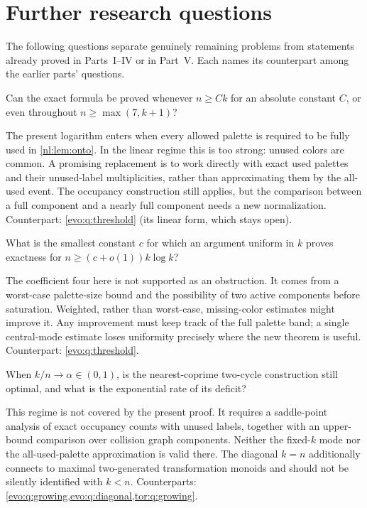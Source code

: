 \documentclass[11pt,a4paper]{article}
\numberwithin{equation}{section}
\theoremstyle{definition}
\theoremstyle{remark}
\begin{document}
\section{Further research questions}\label{nl:sec:questions}

The following questions separate genuinely remaining problems from
statements already proved in Parts~I--IV or in Part~V. Each names its
counterpart among the earlier parts' questions.

\begin{question}\label{nl:q:linear}
Can the exact formula be proved whenever $n\ge Ck$ for an absolute
constant $C$, or even throughout $n\ge\max(7,k+1)$?
\end{question}
The present logarithm enters when every allowed palette is required to be
fully used in \cref{nl:lem:onto}. In the linear regime this is too strong:
unused colors are common. A promising replacement is to work directly
with exact used palettes and their unused-label multiplicities, rather
than approximating them by the all-used event. The occupancy construction
still applies, but the comparison between a full component and a nearly
full component needs a new normalization.
Counterpart: \cref{evo:q:threshold} (its linear form, which stays open).

\begin{question}\label{nl:q:constant}
What is the smallest constant $c$ for which an argument uniform in $k$
proves exactness for $n\ge(c+o(1))k\log k$?
\end{question}
The coefficient four here is not supported as an obstruction. It comes
from a worst-case palette-size bound and the possibility of two active
components before saturation. Weighted, rather than worst-case, missing-color
estimates might improve it. Any improvement must keep track of the full
palette band; a single central-mode estimate loses uniformity precisely
where the new theorem is useful.
Counterpart: \cref{evo:q:threshold}.

\begin{question}\label{nl:q:dense}
When $k/n\to\alpha\in(0,1)$, is the nearest-coprime two-cycle construction
still optimal, and what is the exponential rate of its deficit?
\end{question}
This regime is not covered by the present proof. It requires a saddle-point
analysis of exact occupancy counts with unused labels, together with an
upper-bound comparison over collision graph components. Neither the
fixed-$k$ mode nor the all-used-palette approximation is valid there.
The diagonal $k=n$ additionally connects to maximal two-generated
transformation monoids and should not be silently identified with $k<n$.
Counterparts: \cref{evo:q:growing,evo:q:diagonal,tor:q:growing}.
\end{document}
